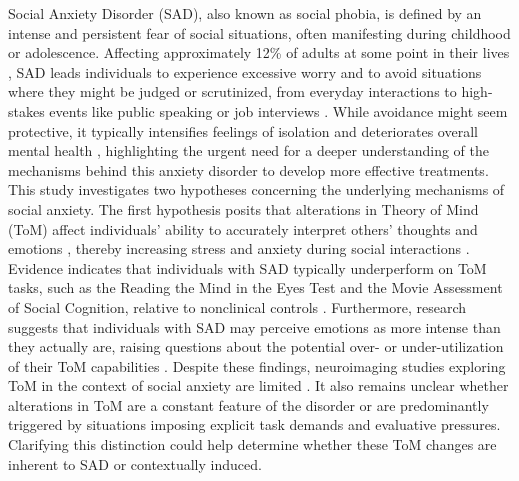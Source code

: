 Social Anxiety Disorder (SAD), also known as social phobia, is defined by an intense and persistent fear of social situations, often manifesting during childhood or adolescence. Affecting approximately 12\% of adults at some point in their lives \citep{kessler2005}, SAD leads individuals to experience excessive worry and to avoid situations where they might be judged or scrutinized, from everyday interactions to high-stakes events like public speaking or job interviews \citep{apa2013}. While avoidance might seem protective, it typically intensifies feelings of isolation and deteriorates overall mental health \citep{lim2016}, highlighting the urgent need for a deeper understanding of the mechanisms behind this anxiety disorder to develop more effective treatments.
This study investigates two hypotheses concerning the underlying mechanisms of social anxiety. The first hypothesis posits that alterations in Theory of Mind (ToM) affect individuals' ability to accurately interpret others' thoughts and emotions \citep{hezel2014}, thereby increasing stress and anxiety during social interactions \citep{catalino2012,leary1995}. Evidence indicates that individuals with SAD typically underperform on ToM tasks, such as the Reading the Mind in the Eyes Test and the Movie Assessment of Social Cognition, relative to nonclinical controls \citep{alvi2020,baez2023,baron-cohen1997,dziobek2006}. Furthermore, research suggests that individuals with SAD may perceive emotions as more intense than they actually are, raising questions about the potential over- or under-utilization of their ToM capabilities \citep{hezel2014,nikolic2019,washburn2016}. Despite these findings, neuroimaging studies exploring ToM in the context of social anxiety are limited \citep{sripada2009}. It also remains unclear whether alterations in ToM are a constant feature of the disorder or are predominantly triggered by situations imposing explicit task demands and evaluative pressures. Clarifying this distinction could help determine whether these ToM changes are inherent to SAD or contextually induced.
